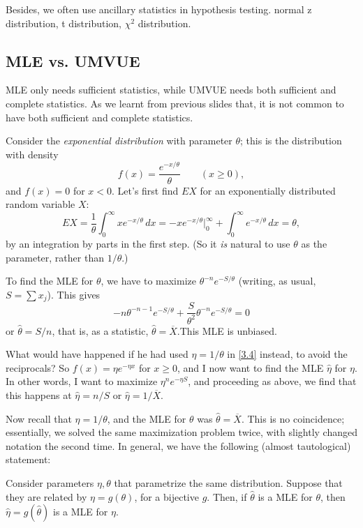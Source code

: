 Besides, we often use ancillary statistics in hypothesis testing. normal z distribution, t distribution, $\chi^2$ distribution. 


\subsection{MLE vs. UMVUE}

MLE only needs sufficient statistics, while UMVUE needs both sufficient and complete statistics. As we learnt from previous slides that, it is not common to have both sufficient and complete statistics.

\begin{Example}
\label{Exexp}
Consider the \textit{exponential distribution }with parameter $\theta$; this is the distribution with density
\begin{equation}
\label{3.4}
f(x) = \frac{e^{-x/\theta}}{\theta} \quad\quad (x\ge 0) ,
\end{equation}
and $f(x)=0$ for $x<0$. Let's first find $EX$ for an exponentially distributed random variable $X$:
\[
EX = \frac{1}{\theta}\int_0^{\infty} xe^{-x/\theta}\, dx = -xe^{-x/\theta}\Bigr|_0^{\infty}  + \int_0^{\infty} e^{-x/\theta}\, dx = \theta ,
\]
by an integration by parts in the first step. (So it \textit{is }natural to use $\theta$ as the parameter, rather than $1/\theta$.)

To find the MLE for $\theta$, we have to maximize
$\theta^{-n}e^{-S/\theta}$ (writing, as usual, $S=\sum x_j$). This gives
\[
-n\theta^{-n-1}e^{-S/\theta} + \frac{S}{\theta^2}\theta^{-n}e^{-S/\theta} = 0
\]
or $\widehat{\theta}=S/n$, that is, as a statistic, $\widehat{\theta}=\overline{X}$.This MLE is unbiased.

What would have happened if he had used $\eta=1/\theta$ in \eqref{3.4} instead, to avoid the reciprocals?
So $f(x)=\eta e^{-\eta x}$ for $x\ge 0$, and I now want to find the MLE $\widehat{\eta}$ for $\eta$. In other words,
I want to maximize $\eta^n e^{-\eta S}$, and proceeding as above, we find that this happens at $\widehat{\eta}=n/S$
or $\widehat{\eta}=1/\overline{X}$.

Now recall that $\eta=1/\theta$, and the MLE for $\theta$ was $\widehat{\theta}=\overline{X}$. This is no coincidence;
essentially, we solved the same maximization problem twice, with slightly changed notation the second time. In general,
we have the following (almost tautological) statement:

\begin{Theorem}
\label{T3.1}
Consider parameters $\eta,\theta$ that parametrize the same distribution.
Suppose that they are related by $\eta = g(\theta)$, for a bijective $g$. Then, if $\widehat{\theta}$ is a MLE
for $\theta$, then $\widehat{\eta}=g(\widehat{\theta})$ is a MLE for $\eta$.
\end{Theorem}

\end{Example}

